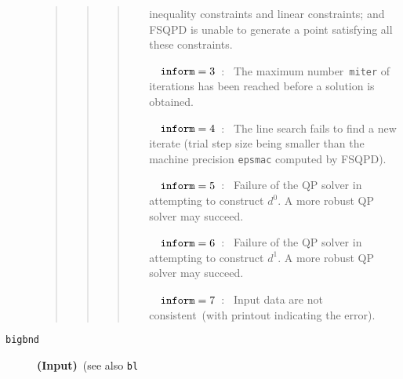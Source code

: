 \begin{description}
\begin{quote}
\begin{quote}
\begin{quote}
\begin{itemize}
                                                 inequality constraints and
                                                 linear constraints; and 
                                                 FSQPD is unable to 
                                                 generate a point
                                                 satisfying all these
                                                 constraints.
                  \item[~~${\tt inform} = 3$~:~] The maximum 
                                               number~{\tt miter} 
                                               of iterations has been 
                                               reached before a 
                                               solution is obtained.
                  \item[~~${\tt inform} = 4$~:~] The line search fails 
                                               to find a new 
                                               iterate (trial step size 
                                                being 
                                            smaller than the machine 
                                            precision 
                                        {\tt epsmac} computed by FSQPD).
                  \item[~~${\tt inform} = 5$~:~] Failure of the QP solver
                                                 in attempting 
                                                to construct $d^0$. A more
                                                robust QP solver may succeed.
                  \item[~~${\tt inform} = 6$~:~] Failure of the QP solver
                                                 in attempting 
                                               to construct $d^1$. A more
                                                robust QP solver may succeed.
                  \item[~~${\tt inform} = 7$~:~] Input data are not 
                                                consistent~(with 
                                                 printout
                                                indicating the error).
                   \end{itemize}
                   \end{quote}
                   \end{quote}
                   \end{quote}
\item[\tt bigbnd]  {\bf (Input)}~(see also {\tt bl} 

\end{description}
